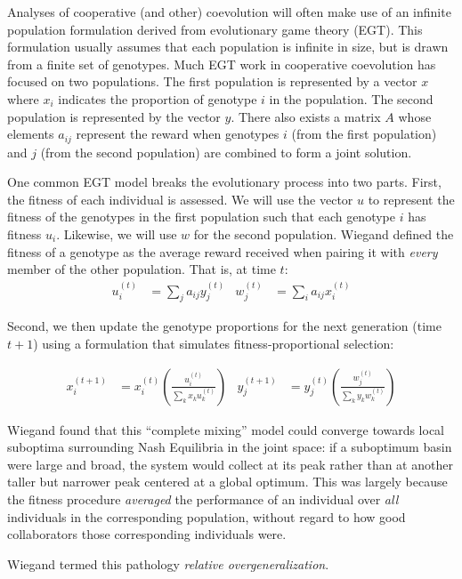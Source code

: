 \documentclass{sig-alt-full}
\begin{document}
Analyses of cooperative (and other) coevolution will often make use of an infinite population formulation derived from evolutionary game theory (EGT).  This formulation usually assumes that each population is infinite in size, but is drawn from a finite set of genotypes. Much EGT work in cooperative coevolution has focused on two populations.  The first population is represented by a vector \(x\) where \(x_i\) indicates the proportion of genotype \(i\) in the population.  The second population is represented by the vector \(y\).  There also exists a matrix \(A\) whose elements \(a_{ij}\) represent the reward when genotypes \(i\) (from the first population) and \(j\) (from the second population) are combined to form a joint solution.

One common EGT model breaks the evolutionary process into two parts.  First, the fitness of each individual is assessed. We will use the vector \(u\) to represent the fitness of the genotypes in the first population such that each genotype \(i\) has fitness \(u_i\).  Likewise, we will use \(w\) for the second population.  Wiegand \cite{Wiegand2003phd} defined the fitness of a genotype as the average reward received when pairing it with {\it every} member of the other population.  That is, at time \(t\):
%
\begin{align}
\label{egtfitness}
u_i^{(t)} &= \sum_j a_{ij} y_j^{(t)} &
w_j^{(t)} &= \sum_i a_{ij} x_i^{(t)}
\end{align}

Second, we then update the genotype proportions for the next generation (time \(t+1\)) using a formulation that simulates fitness-proportional selection:

\begin{align}
\label{eqtupdate}
x_i^{(t+1)} &= x_i^{(t)} \left( \frac{u_i^{(t)}}{\sum_k x_k u_k^{(t)}} \right) &
y_j^{(t+1)} &= y_j^{(t)} \left( \frac{w_j^{(t)}}{\sum_k y_k w_k^{(t)}} \right)
\end{align}

Wiegand found that this ``complete mixing'' model could converge towards local suboptima surrounding Nash Equilibria in the joint space: if a suboptimum basin were large and broad, the system would collect at its peak rather than at another taller but narrower peak centered at a global optimum.  This was largely because the fitness procedure {\it averaged} the performance of an individual over {\it all} individuals in the corresponding population, without regard to how good collaborators those corresponding individuals were. Wiegand termed this pathology {\it relative overgeneralization}.
\end{document}
